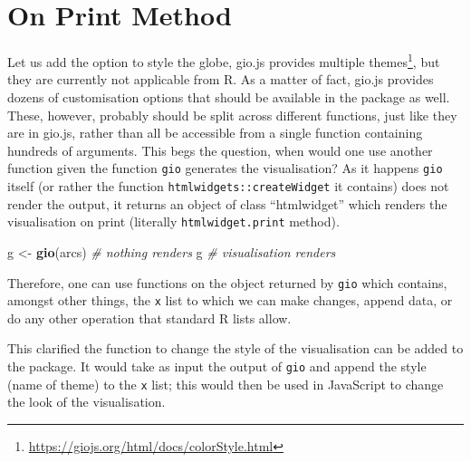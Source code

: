 \documentclass[
]{krantz}
\makeatletter
\newenvironment{Shaded}{\begin{snugshade}}{\end{snugshade}}
\newcommand{\CommentTok}[1]{\textcolor[rgb]{0.37,0.37,0.37}{\textit{#1}}}
\newcommand{\KeywordTok}[1]{\textcolor[rgb]{0.27,0.27,0.27}{\textbf{#1}}}
\newcommand{\NormalTok}[1]{#1}
\newcommand{\OperatorTok}[1]{\textcolor[rgb]{0.43,0.43,0.43}{\textbf{#1}}}
\newcommand{\StringTok}[1]{\textcolor[rgb]{0.5,0.5,0.5}{#1}}
\renewcommand{\href}[2]{#2\footnote{\url{#1}}}
\newenvironment{kframe}{%
\medskip{}
\setlength{\fboxsep}{.8em}
 \def\at@end@of@kframe{}%
 \ifinner\ifhmode%
  \def\at@end@of@kframe{\end{minipage}}%
  \begin{minipage}{\columnwidth}%
 \fi\fi%
 \def\FrameCommand##1{\hskip\@totalleftmargin \hskip-\fboxsep
 \colorbox{shadecolor}{##1}\hskip-\fboxsep
     \hskip-\linewidth \hskip-\@totalleftmargin \hskip\columnwidth}%
 \MakeFramed {\advance\hsize-\width
   \@totalleftmargin\z@ \linewidth\hsize
   \@setminipage}}%
 {\par\unskip\endMakeFramed%
 \at@end@of@kframe}
\renewenvironment{Shaded}{\begin{kframe}}{\end{kframe}}
\makeatother
\begin{document}
\hypertarget{widgets-full-on-print}{%
\section{On Print Method}\label{widgets-full-on-print}}

Let us add the option to style the globe, gio.js provides multiple \href{https://giojs.org/html/docs/colorStyle.html}{themes}, but they are currently not applicable from R. As a matter of fact, gio.js provides dozens of customisation options that should be available in the package as well. These, however, probably should be split across different functions, just like they are in gio.js, rather than all be accessible from a single function containing hundreds of arguments. This begs the question, when would one use another function given the function \texttt{gio} generates the visualisation? As it happens \texttt{gio} itself (or rather the function \texttt{htmlwidgets::createWidget} it contains) does not render the output, it returns an object of class ``htmlwidget'' which renders the visualisation on print (literally \texttt{htmlwidget.print} method).

\begin{Shaded}
\begin{Highlighting}[]
\NormalTok{g <{-}}\StringTok{ }\KeywordTok{gio}\NormalTok{(arcs) }\CommentTok{\# nothing renders}
\NormalTok{g }\CommentTok{\# visualisation renders}
\end{Highlighting}
\end{Shaded}

Therefore, one can use functions on the object returned by \texttt{gio} which contains, amongst other things, the \texttt{x} list to which we can make changes, append data, or do any other operation that standard R lists allow.

\begin{Shaded}
\end{Shaded}

This clarified the function to change the style of the visualisation can be added to the package. It would take as input the output of \texttt{gio} and append the style (name of theme) to the \texttt{x} list; this would then be used in JavaScript to change the look of the visualisation.
\end{document}
